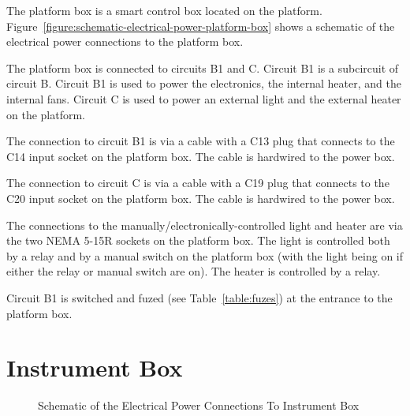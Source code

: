 The platform box is a smart control box located on the platform. Figure~\ref{figure:schematic-electrical-power-platform-box} shows a schematic of the electrical power connections to the platform box.


The platform box is connected to circuits B1 and C. Circuit B1 is a subcircuit of circuit B. Circuit B1 is used to power the electronics, the internal heater, and the internal fans. Circuit C is used to power an external light and the external heater on the platform.

The connection to circuit B1 is via a cable with a C13 plug that connects to the C14 input socket on the platform box. The cable is hardwired to the power box.

The connection to circuit C is via a cable with a C19 plug that connects to the C20 input socket on the platform box. The cable is hardwired to the power box.

The connections to the manually/electronically-controlled light and heater are via the two NEMA 5-15R sockets on the platform box. The light is controlled both by a relay and by a manual switch on the platform box (with the light being on if either the relay or manual switch are on). The heater is controlled by a relay.

Circuit B1 is switched and fuzed (see Table~\ref{table:fuzes}) at the entrance to the platform box.

\ifcoatli

\section{Instrument Box}

\begin{figure}
\begin{center}
\footnotesize 
{}
\end{center}
\caption{Schematic of the Electrical Power Connections To Instrument Box}
\label{figure:schematic-electrical-power-instrument-box}
\end{figure}

